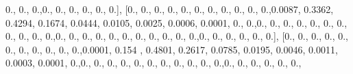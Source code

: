 \documentclass[
]{book}
\newenvironment{Shaded}{\begin{snugshade}}{\end{snugshade}}
\newcommand{\FloatTok}[1]{\textcolor[rgb]{0.00,0.00,0.81}{#1}}
\newcommand{\NormalTok}[1]{#1}
\begin{document}
\begin{Shaded}
\begin{Highlighting}[]
\FloatTok{0.}\NormalTok{, }\FloatTok{0.}\NormalTok{, }\FloatTok{0.}\NormalTok{,}\FloatTok{0.}\NormalTok{, }\FloatTok{0.}\NormalTok{, }\FloatTok{0.}\NormalTok{, }\FloatTok{0.}\NormalTok{, }\FloatTok{0.}\NormalTok{, }\FloatTok{0.}\NormalTok{], [}\FloatTok{0.}\NormalTok{, }\FloatTok{0.}\NormalTok{, }\FloatTok{0.}\NormalTok{, }\FloatTok{0.}\NormalTok{, }\FloatTok{0.}\NormalTok{, }\FloatTok{0.}\NormalTok{, }\FloatTok{0.}\NormalTok{, }\FloatTok{0.}\NormalTok{, }\FloatTok{0.}\NormalTok{, }\FloatTok{0.}\NormalTok{,}
\FloatTok{0.}\NormalTok{,}\FloatTok{0.0087}\NormalTok{, }\FloatTok{0.3362}\NormalTok{, }\FloatTok{0.4294}\NormalTok{, }\FloatTok{0.1674}\NormalTok{, }\FloatTok{0.0444}\NormalTok{, }\FloatTok{0.0105}\NormalTok{, }\FloatTok{0.0025}\NormalTok{, }\FloatTok{0.0006}\NormalTok{, }\FloatTok{0.0001}\NormalTok{, }\FloatTok{0.}\NormalTok{,}
\FloatTok{0.}\NormalTok{,}\FloatTok{0.}\NormalTok{, }\FloatTok{0.}\NormalTok{, }\FloatTok{0.}\NormalTok{, }\FloatTok{0.}\NormalTok{, }\FloatTok{0.}\NormalTok{, }\FloatTok{0.}\NormalTok{, }\FloatTok{0.}\NormalTok{, }\FloatTok{0.}\NormalTok{, }\FloatTok{0.}\NormalTok{, }\FloatTok{0.}\NormalTok{, }\FloatTok{0.}\NormalTok{,}\FloatTok{0.}\NormalTok{, }\FloatTok{0.}\NormalTok{, }\FloatTok{0.}\NormalTok{, }\FloatTok{0.}\NormalTok{, }\FloatTok{0.}\NormalTok{, }\FloatTok{0.}\NormalTok{, }\FloatTok{0.}\NormalTok{, }\FloatTok{0.}\NormalTok{,}
\FloatTok{0.}\NormalTok{, }\FloatTok{0.}\NormalTok{, }\FloatTok{0.}\NormalTok{,}\FloatTok{0.}\NormalTok{, }\FloatTok{0.}\NormalTok{, }\FloatTok{0.}\NormalTok{, }\FloatTok{0.}\NormalTok{, }\FloatTok{0.}\NormalTok{, }\FloatTok{0.}\NormalTok{], [}\FloatTok{0.}\NormalTok{, }\FloatTok{0.}\NormalTok{, }\FloatTok{0.}\NormalTok{, }\FloatTok{0.}\NormalTok{, }\FloatTok{0.}\NormalTok{, }\FloatTok{0.}\NormalTok{, }\FloatTok{0.}\NormalTok{, }\FloatTok{0.}\NormalTok{, }\FloatTok{0.}\NormalTok{, }\FloatTok{0.}\NormalTok{,}
\FloatTok{0.}\NormalTok{,}\FloatTok{0.0001}\NormalTok{, }\FloatTok{0.154}\NormalTok{ , }\FloatTok{0.4801}\NormalTok{, }\FloatTok{0.2617}\NormalTok{, }\FloatTok{0.0785}\NormalTok{, }\FloatTok{0.0195}\NormalTok{, }\FloatTok{0.0046}\NormalTok{, }\FloatTok{0.0011}\NormalTok{, }\FloatTok{0.0003}\NormalTok{,}
\FloatTok{0.0001}\NormalTok{, }\FloatTok{0.}\NormalTok{,}\FloatTok{0.}\NormalTok{, }\FloatTok{0.}\NormalTok{, }\FloatTok{0.}\NormalTok{, }\FloatTok{0.}\NormalTok{, }\FloatTok{0.}\NormalTok{, }\FloatTok{0.}\NormalTok{, }\FloatTok{0.}\NormalTok{, }\FloatTok{0.}\NormalTok{, }\FloatTok{0.}\NormalTok{, }\FloatTok{0.}\NormalTok{, }\FloatTok{0.}\NormalTok{,}\FloatTok{0.}\NormalTok{, }\FloatTok{0.}\NormalTok{, }\FloatTok{0.}\NormalTok{, }\FloatTok{0.}\NormalTok{, }\FloatTok{0.}\NormalTok{, }\FloatTok{0.}\NormalTok{,}

\end{Highlighting}
\end{Shaded}
\end{document}

